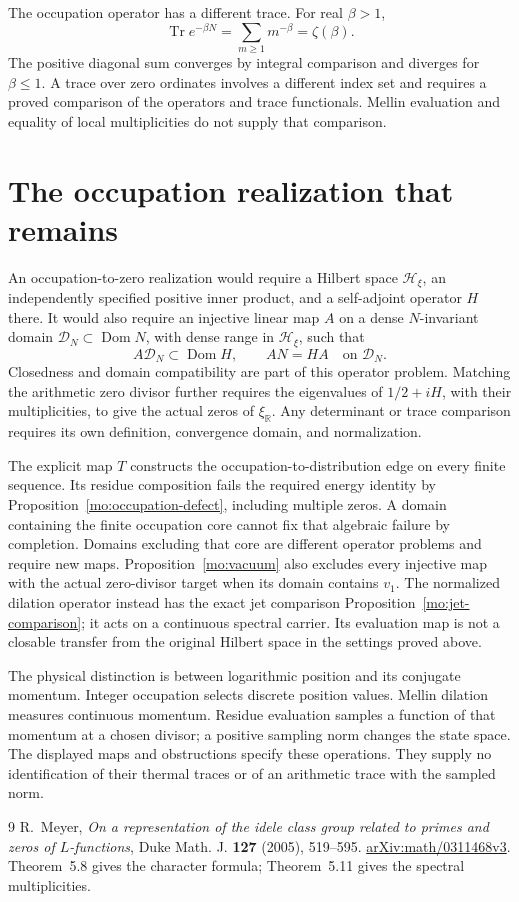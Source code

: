 The occupation operator has a different trace. For real $\beta>1$,
\[
 \operatorname{Tr}e^{-\beta N}=\sum_{m\geq1}m^{-\beta}
 =\zeta(\beta).
\]
The positive diagonal sum converges by integral comparison and
diverges for $\beta\leq1$. A trace over zero ordinates involves
a different index set and requires a proved comparison of the
operators and trace functionals. Mellin evaluation and equality
of local multiplicities do not supply that comparison.

\section{The occupation realization that remains}

An occupation-to-zero realization would require a Hilbert space
$\mathscr H_\xi$, an independently specified positive inner product,
and a self-adjoint operator $H$ there. It would also require an
injective linear map $A$ on a dense $N$-invariant domain
$\mathscr D_N\subset\operatorname{Dom}N$, with dense range in
$\mathscr H_\xi$, such that
\[
 A\mathscr D_N\subset\operatorname{Dom}H,\qquad
 AN=HA\quad\text{on }\mathscr D_N.
\]
Closedness and domain compatibility are part of this operator
problem. Matching the arithmetic zero divisor further requires
the eigenvalues of $1/2+iH$, with their multiplicities, to give
the actual zeros of $\xi_{\mathbb R}$. Any determinant or trace
comparison requires its own definition, convergence domain, and
normalization.

The explicit map $T$ constructs the occupation-to-distribution
edge on every finite sequence. Its residue composition fails the
required energy identity by Proposition~\ref{mo:occupation-defect}, including
multiple zeros. A domain containing the finite occupation core
cannot fix that algebraic failure by completion. Domains excluding
that core are different operator problems and require new maps.
Proposition~\ref{mo:vacuum} also excludes every injective map
with the actual zero-divisor target when its domain contains $v_1$.
The normalized dilation operator instead has the exact jet
comparison Proposition~\ref{mo:jet-comparison}; it acts on a continuous
spectral carrier. Its evaluation map is not a closable transfer
from the original Hilbert space in the settings proved above.

The physical distinction is between logarithmic position and its
conjugate momentum. Integer occupation selects discrete position
values. Mellin dilation measures continuous momentum. Residue
evaluation samples a function of that momentum at a chosen divisor;
a positive sampling norm changes the state space. The displayed
maps and obstructions specify these operations. They supply no
identification of their thermal traces or of an arithmetic trace
with the sampled norm.

\begin{thebibliography}{9}
R.~Meyer, \emph{On a representation of the idele class group related
to primes and zeros of $L$-functions}, Duke Math. J. \textbf{127}
(2005), 519--595. \href{https://arxiv.org/abs/math/0311468v3}
{arXiv:math/0311468v3}. Theorem~5.8 gives the character formula;
Theorem~5.11 gives the spectral multiplicities.
\end{thebibliography}
